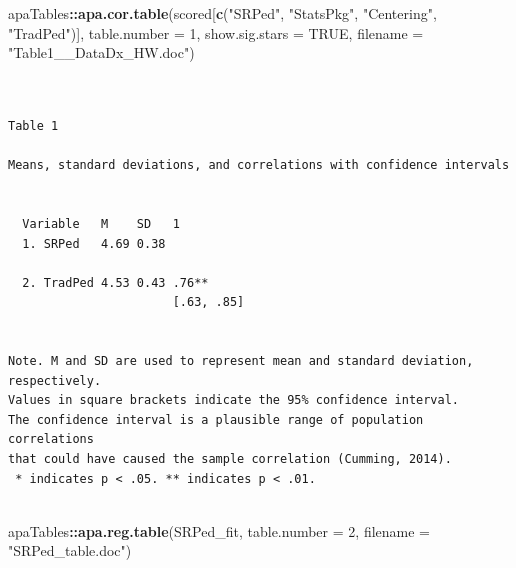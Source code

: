 \documentclass[
  11pt,
]{book}
\newenvironment{Shaded}{\begin{snugshade}}{\end{snugshade}}
\newcommand{\AttributeTok}[1]{\textcolor[rgb]{0.27,0.27,0.27}{#1}}
\newcommand{\ConstantTok}[1]{\textcolor[rgb]{0.37,0.37,0.37}{#1}}
\newcommand{\DecValTok}[1]{\textcolor[rgb]{0.06,0.06,0.06}{#1}}
\newcommand{\FunctionTok}[1]{\textcolor[rgb]{0.27,0.27,0.27}{\textbf{#1}}}
\newcommand{\NormalTok}[1]{#1}
\newcommand{\SpecialCharTok}[1]{\textcolor[rgb]{0.43,0.43,0.43}{\textbf{#1}}}
\newcommand{\StringTok}[1]{\textcolor[rgb]{0.5,0.5,0.5}{#1}}
\begin{document}
\begin{Shaded}
\begin{Highlighting}[]
\NormalTok{apaTables}\SpecialCharTok{::}\FunctionTok{apa.cor.table}\NormalTok{(scored[}\FunctionTok{c}\NormalTok{(}\StringTok{"SRPed"}\NormalTok{, }\StringTok{"StatsPkg"}\NormalTok{, }\StringTok{"Centering"}\NormalTok{, }\StringTok{"TradPed"}\NormalTok{)],}
    \AttributeTok{table.number =} \DecValTok{1}\NormalTok{, }\AttributeTok{show.sig.stars =} \ConstantTok{TRUE}\NormalTok{, }\AttributeTok{filename =} \StringTok{"Table1\_\_DataDx\_HW.doc"}\NormalTok{)}
\end{Highlighting}
\end{Shaded}

\begin{verbatim}


Table 1 

Means, standard deviations, and correlations with confidence intervals
 

  Variable   M    SD   1         
  1. SRPed   4.69 0.38           
                                 
  2. TradPed 4.53 0.43 .76**     
                       [.63, .85]
                                 

Note. M and SD are used to represent mean and standard deviation, respectively.
Values in square brackets indicate the 95% confidence interval.
The confidence interval is a plausible range of population correlations 
that could have caused the sample correlation (Cumming, 2014).
 * indicates p < .05. ** indicates p < .01.
 
\end{verbatim}

\begin{Shaded}
\begin{Highlighting}[]
\NormalTok{apaTables}\SpecialCharTok{::}\FunctionTok{apa.reg.table}\NormalTok{(SRPed\_fit, }\AttributeTok{table.number =} \DecValTok{2}\NormalTok{, }\AttributeTok{filename =} \StringTok{"SRPed\_table.doc"}\NormalTok{)}
\end{Highlighting}
\end{Shaded}
\end{document}
